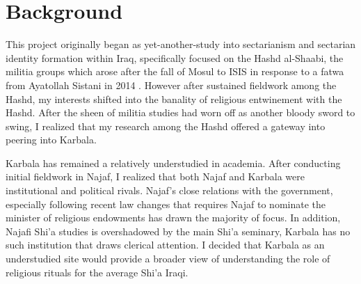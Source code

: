 

\section{Background}
This project originally began as yet-another-study into sectarianism and sectarian identity formation within Iraq, specifically focused on the Hashd al-Shaabi, the militia groups which arose after the fall of Mosul to ISIS in response to a fatwa from Ayatollah Sistani in 2014 \cite{jonathan_stevenson_shia_2017}. However after sustained fieldwork among the Hashd, my interests shifted into the banality of religious entwinement with the Hashd. After the sheen of militia studies had worn off as another bloody sword to swing, I realized that my research among the Hashd offered a gateway into peering into Karbala. 


Karbala has remained a relatively understudied in academia. After conducting initial fieldwork in Najaf, I realized that both Najaf and Karbala were institutional and political rivals. Najaf's close relations with the government, especially following recent law changes that requires Najaf to nominate the minister of religious endowments \cite{hamoudi_engagements_2020} has drawn the majority of focus. In addition, Najafi Shi'a studies is overshadowed by the main Shi'a seminary, Karbala has no such institution that draws clerical attention. I decided that Karbala as an understudied site would provide a broader view of understanding the role of religious rituals for the average Shi'a Iraqi. 


